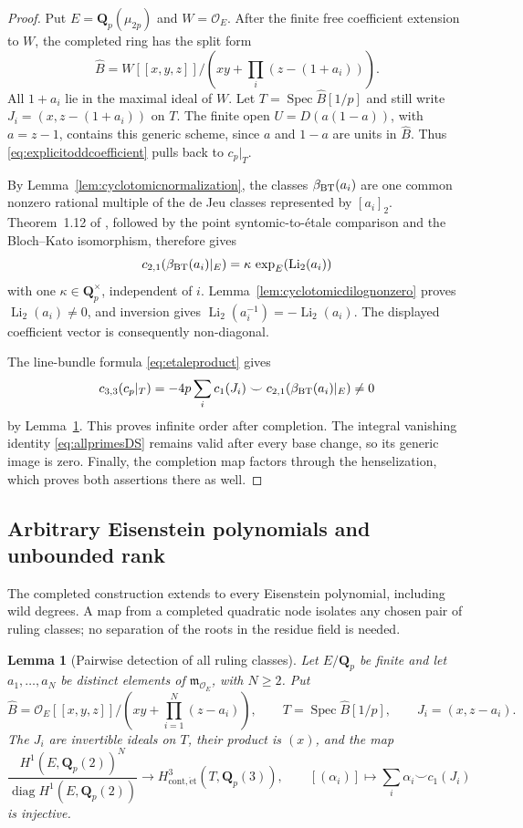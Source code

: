 \documentclass[11pt,a4paper]{article}
\newtheorem{lemma}[theorem]{Lemma}
\theoremstyle{remark}
\newcommand{\Q}{\mathbf Q}
\newcommand{\OO}{\mathcal O}
\newcommand{\Spec}{\operatorname{Spec}}
\begin{document}
\begin{proof}
Put $E=\Q_p(\mu_{2p})$ and $W=\OO_E$.
After the finite free coefficient extension to $W$, the completed
ring has the split form
\[
 \widehat B=
 W[[x,y,z]]\Big/\left(xy+\prod_i(z-(1+a_i))\right).
\]
All $1+a_i$ lie in the maximal ideal of $W$.
Let $T=\Spec\widehat B[1/p]$ and still write
$J_i=(x,z-(1+a_i))$ on $T$.
The finite open $U=D(a(1-a))$, with $a=z-1$, contains this generic
scheme, since $a$ and $1-a$ are units in $\widehat B$.
Thus \eqref{eq:explicitoddcoefficient} pulls back to $c_p|_T$.

By Lemma~\ref{lem:cyclotomicnormalization}, the classes
$\beta_{\rm BT}(a_i)$ are one common nonzero rational multiple of
the de Jeu classes represented by $[a_i]_2$.
Theorem~1.12 of \cite{BesserDeJeu}, followed by the point
syntomic-to-\'etale comparison and the Bloch--Kato isomorphism,
therefore gives
\[
 c_{2,1}(\beta_{\rm BT}(a_i)|_E)
   =\kappa\,\exp_E(\operatorname{Li}_2(a_i))
\]
with one $\kappa\in\Q_p^\times$, independent of $i$.
Lemma~\ref{lem:cyclotomicdilognonzero} proves
$\operatorname{Li}_2(a_i)\ne0$, and inversion gives
$\operatorname{Li}_2(a_i^{-1})=-\operatorname{Li}_2(a_i)$.
The displayed coefficient vector is consequently non-diagonal.

The line-bundle formula \eqref{eq:etaleproduct} gives
\[
 c_{3,3}(c_p|_T)
 =-4p\sum_i c_1(J_i)\smile
                c_{2,1}(\beta_{\rm BT}(a_i)|_E)\ne0
\]
by Lemma~\ref{lem:completedrootcup}.
This proves infinite order after completion.
The integral vanishing identity \eqref{eq:allprimesDS} remains
valid after every base change, so its generic image is zero.
Finally, the completion map factors through the henselization,
which proves both assertions there as well.
\end{proof}

\subsection{Arbitrary Eisenstein polynomials and unbounded rank}
\label{sec:completedarbitraryrank}\label{sec:completedtamerank}

The completed construction extends to every Eisenstein polynomial, including wild degrees. A map from a completed quadratic node isolates any chosen pair of ruling classes; no separation of the roots in the residue field is needed.

\begin{lemma}[Pairwise detection of all ruling classes]\label{lem:completedrootcup}\label{lem:completedtamecup}
Let $E/\Q_p$ be finite and let $a_1,\ldots,a_N$ be distinct elements of $\mathfrak m_{\OO_E}$, with $N\geq2$. Put
\[
\widehat B=\OO_E[[x,y,z]]/
\left(xy+\prod_{i=1}^N(z-a_i)\right),
\qquad T=\Spec\widehat B[1/p],
\qquad J_i=(x,z-a_i).
\]
The $J_i$ are invertible ideals on $T$, their product is $(x)$, and the map
\begin{equation}\label{eq:completedtamecup}
\frac{H^1(E,\Q_p(2))^N}
{\operatorname{diag}H^1(E,\Q_p(2))}
\longrightarrow H^3_{\mathrm{cont},\mathrm{\acute et}}(T,\Q_p(3)),
\qquad
[(\alpha_i)]\longmapsto\sum_i\alpha_i\smile c_1(J_i)
\end{equation}
is injective.
\end{lemma}
\end{document}
